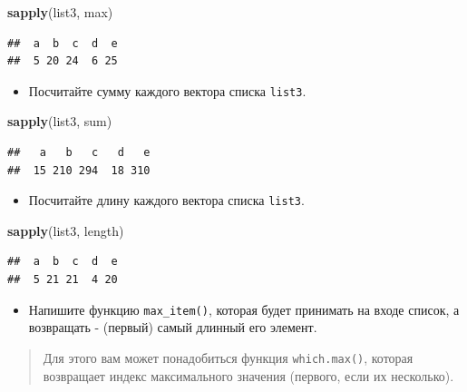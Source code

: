 \documentclass[]{book}
\newenvironment{Shaded}{\begin{snugshade}}{\end{snugshade}}
\newcommand{\KeywordTok}[1]{\textcolor[rgb]{0.13,0.29,0.53}{\textbf{#1}}}
\newcommand{\NormalTok}[1]{#1}
\providecommand{\tightlist}{%
  \setlength{\itemsep}{0pt}\setlength{\parskip}{0pt}}
\begin{document}
\begin{Shaded}
\begin{Highlighting}[]
\KeywordTok{sapply}\NormalTok{(list3, max)}
\end{Highlighting}
\end{Shaded}

\begin{verbatim}
##  a  b  c  d  e 
##  5 20 24  6 25
\end{verbatim}

\begin{itemize}
\tightlist
\item
  Посчитайте сумму каждого вектора списка \texttt{list3}.
\end{itemize}

\begin{Shaded}
\begin{Highlighting}[]
\KeywordTok{sapply}\NormalTok{(list3, sum)}
\end{Highlighting}
\end{Shaded}

\begin{verbatim}
##   a   b   c   d   e 
##  15 210 294  18 310
\end{verbatim}

\begin{itemize}
\tightlist
\item
  Посчитайте длину каждого вектора списка \texttt{list3}.
\end{itemize}

\begin{Shaded}
\begin{Highlighting}[]
\KeywordTok{sapply}\NormalTok{(list3, length)}
\end{Highlighting}
\end{Shaded}

\begin{verbatim}
##  a  b  c  d  e 
##  5 21 21  4 20
\end{verbatim}

\begin{itemize}
\tightlist
\item
  Напишите функцию \texttt{max\_item()}, которая будет принимать на
  входе список, а возвращать - (первый) самый длинный его элемент.
\end{itemize}

\begin{quote}
Для этого вам может понадобиться функция \texttt{which.max()}, которая
возвращает индекс максимального значения (первого, если их несколько).
\end{quote}
\end{document}
